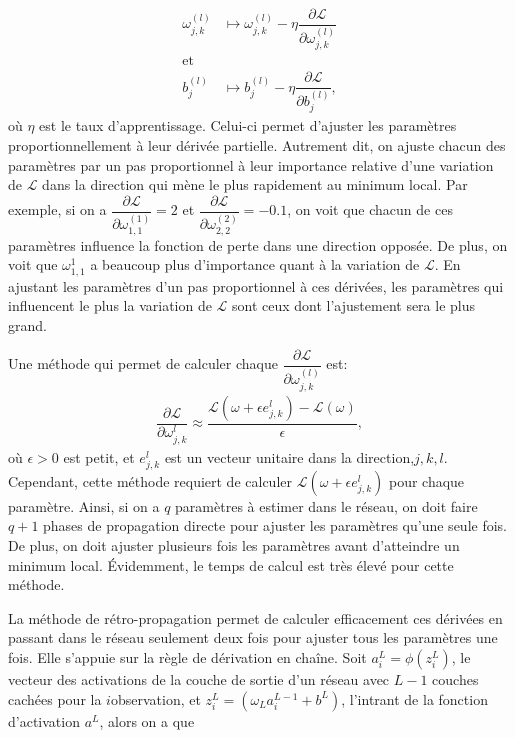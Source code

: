 \begin{align*}
\omega^{(l)}_{j,k} &\mapsto \omega^{(l)}_{j,k} - \eta \dfrac{\partial\mathcal{L}}{\partial \omega^{(l)}_{j,k}} \\
\text{et} \\
b^{(l)}_{j} &\mapsto b^{(l)}_{j} -  \eta \dfrac{\partial\mathcal{L}}{\partial b^{(l)}_{j}},
\end{align*}
où $\eta$ est le taux d'apprentissage. Celui-ci permet d'ajuster les paramètres proportionnellement à leur dérivée partielle. Autrement dit, on ajuste chacun des paramètres par un pas proportionnel à leur importance relative d'une variation de $\mathcal{L}$ dans la direction qui mène le plus rapidement au minimum local. Par exemple, si on a $\dfrac{\partial\mathcal{L}}{\partial \omega^{(1)}_{1,1}}=2$ et $\dfrac{\partial\mathcal{L}}{\partial \omega^{(2)}_{2,2}}=-0.1$, on voit que chacun de ces paramètres influence la fonction de perte dans une direction opposée. De plus, on voit que $\omega^1_{1,1}$ a beaucoup plus d'importance quant à la variation de $\mathcal{L}$. En ajustant les paramètres d'un pas proportionnel à ces dérivées, les paramètres qui influencent le plus la variation de $\mathcal{L}$ sont ceux  dont l'ajustement sera le plus grand. 


Une méthode qui permet de calculer chaque $\dfrac{\partial\mathcal{L}}{\partial \omega^{(l)}_{j,k}}$ est:
\begin{align*}
\dfrac{\partial \mathcal{L}}{\partial \omega_{j,k}^l} \approx \dfrac{\mathcal{L}\left(\omega+\epsilon e_{j,k}^l \right)-\mathcal{L}(\omega)}{\epsilon},
\end{align*}
où $\epsilon>0$ est petit, et $ e_{j,k}^l$ est un vecteur unitaire dans la direction,$j,k,l$. Cependant, cette méthode requiert de calculer $\mathcal{L}\left(\omega+\epsilon e_{j,k}^l \right)$ pour chaque paramètre. Ainsi, si on a $q$ paramètres à estimer dans le réseau, on doit faire $q + 1$ phases de propagation directe pour ajuster les paramètres qu'une seule fois. De plus, on doit ajuster plusieurs fois les paramètres avant d'atteindre un minimum local. Évidemment, le temps de calcul est très élevé pour cette méthode. 


La méthode de rétro-propagation permet de calculer efficacement ces dérivées en passant dans le réseau seulement deux fois pour ajuster tous les paramètres une fois. Elle s'appuie sur la règle de dérivation en chaîne. Soit $a^L_i = \phi(z^L_i)$, le vecteur des activations de la couche de sortie d'un réseau avec $L-1$ couches cachées pour la $i$\ieme observation, et $z^L_i = (\omega_L a^{L-1}_i + b^L) $, l'intrant de la fonction d'activation $a^L$, alors on a que

